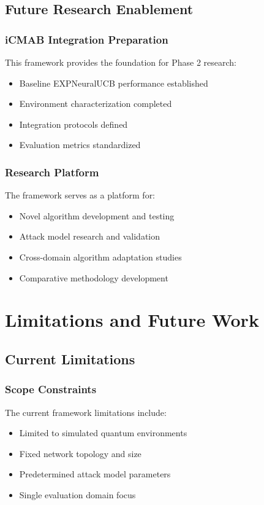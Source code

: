 \documentclass[11pt,a4paper]{article}
\begin{document}
\subsection{Future Research Enablement}

\subsubsection{iCMAB Integration Preparation}

This framework provides the foundation for Phase 2 research:
\begin{itemize}
\item Baseline EXPNeuralUCB performance established
\item Environment characterization completed
\item Integration protocols defined
\item Evaluation metrics standardized
\end{itemize}

\subsubsection{Research Platform}

The framework serves as a platform for:
\begin{itemize}
\item Novel algorithm development and testing
\item Attack model research and validation
\item Cross-domain algorithm adaptation studies
\item Comparative methodology development
\end{itemize}

\section{Limitations and Future Work}

\subsection{Current Limitations}

\subsubsection{Scope Constraints}

The current framework limitations include:
\begin{itemize}
\item Limited to simulated quantum environments
\item Fixed network topology and size
\item Predetermined attack model parameters
\item Single evaluation domain focus
\end{itemize}
\end{document}
